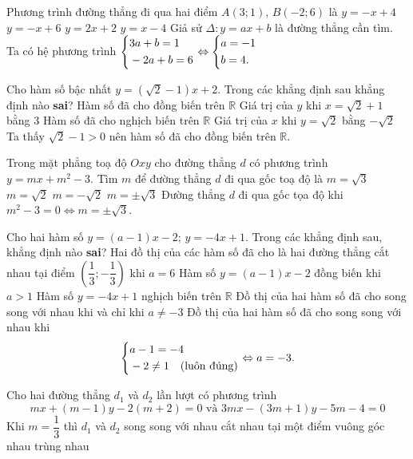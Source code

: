 \begin{ex}%
	Phương trình đường thẳng đi qua hai điểm $A(3;1)$, $B(-2;6) $ là
	\choice
	{\True $y=-x+4$}
	{$ y=-x+6$}
	{$ y=2x+2$}
	{$y=x-4 $}
	\loigiai
	{
		Giả sử $\Delta\colon y=ax+b$ là đường thẳng cần tìm.\\	
		Ta có hệ phương trình $ \left\{\begin{aligned}&3a+b=1\\&-2a+b=6\end{aligned}\right. \Leftrightarrow \left\{\begin{aligned}&a=-1\\&b=4.\end{aligned}\right.$
	}
\end{ex}

\begin{ex}%
	Cho hàm số bậc nhất $ y=\left( \sqrt{2}-1\right)x+2  $.  Trong các khẳng định  sau khẳng định nào \textbf{sai}?
	\choice
	{Hàm số đã cho đồng biến trên $ \mathbb{R} $}
	{Giá trị của $ y $ khi $ x=\sqrt{2}+1 $ bằng $ 3 $}
	{\True Hàm số đã cho nghịch biến trên $ \mathbb{R} $}
	{Giá trị của $ x $ khi $ y=\sqrt{2} $ bằng $ -\sqrt{2} $}
	\loigiai
	{
		Ta thấy $\sqrt 2-1>0$ nên hàm số đã cho đồng biến trên $\mathbb{R}$.
	}
\end{ex}

\begin{ex}%
	Trong mặt phẳng toạ độ $Oxy$ cho đường thẳng $d$ có phương trình $y=mx+m^2-3$. Tìm $m$ để đường thẳng $d$ đi qua gốc toạ độ là
	\choice
	{$m=\sqrt{3} $}
	{$ m=\sqrt{2}$}
	{$ m=-\sqrt{2}$}
	{\True $m=\pm\sqrt{3} $}
	\loigiai
	{
		Đường thẳng $d$ đi qua gốc tọa độ khi $m^2-3=0\Leftrightarrow m=\pm \sqrt 3$.
	}
\end{ex}

\begin{ex}%
	Cho hai hàm số $y=(a-1)x-2$; $y=-4x+1$. Trong các khẳng định sau, khẳng định nào \textbf{sai}?
	\choice
	{Hai đồ thị của các hàm số đã cho là hai đường thẳng cắt nhau tại điểm $\left(\dfrac{1}{3};-\dfrac{1}{3} \right)$ khi $a=6$}
	{Hàm số $y=(a-1)x-2$ đồng biến khi $a>1$ }
	{Hàm số $y=-4x+1$ nghịch biến trên $\mathbb{R}$}
	{\True Đồ thị của hai hàm số đã cho song song với nhau khi và chỉ khi $a \ne -3$}
	\loigiai
	{
		Đồ thị của hai hàm số đã cho song song với nhau khi 
		\[\left\{\begin{aligned}&a-1=-4\\ &-2\neq 1\quad (\text{luôn đúng})\end{aligned}\right.\Leftrightarrow a=-3.\]	
	}
\end{ex}

\begin{ex}%
	Cho hai đường thẳng $d_1$ và $d_2$ lần lượt có phương trình $$ mx+(m-1)y-2(m+2)=0 \,\,\text{và}\,\, 3mx-(3m+1)y-5m-4=0 $$
	Khi $m=\dfrac{1}{3}$ thì $d_1$ và $d_2$
	\choice
	{\True song song với nhau}
	{cắt nhau tại một điểm}
	{vuông góc nhau}
	{trùng nhau}
\end{ex}

